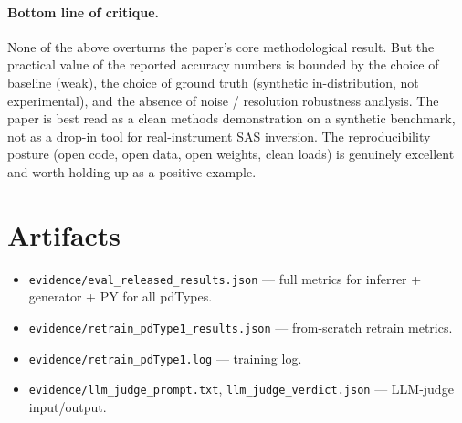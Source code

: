 \documentclass[11pt]{article}
\begin{document}
\paragraph{Bottom line of critique.}
None of the above overturns the paper's core methodological result. But
the practical value of the reported accuracy numbers is bounded by the
choice of baseline (weak), the choice of ground truth (synthetic
in-distribution, not experimental), and the absence of noise / resolution
robustness analysis. The paper is best read as a clean methods
demonstration on a synthetic benchmark, not as a drop-in tool for
real-instrument SAS inversion. The reproducibility posture (open code,
open data, open weights, clean loads) is genuinely excellent and worth
holding up as a positive example.

\section*{Artifacts}
\begin{itemize}\itemsep0pt
  \item \texttt{evidence/eval\_released\_results.json} --- full metrics
  for inferrer + generator + PY for all pdTypes.
  \item \texttt{evidence/retrain\_pdType1\_results.json} --- from-scratch
  retrain metrics.
  \item \texttt{evidence/retrain\_pdType1.log} --- training log.
  \item \texttt{evidence/llm\_judge\_prompt.txt},
  \texttt{llm\_judge\_verdict.json} --- LLM-judge input/output.
\end{itemize}
\end{document}
